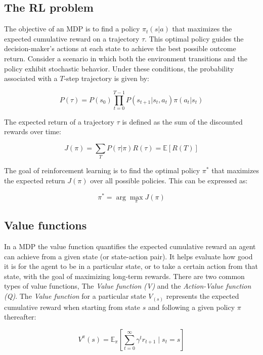 \subsection{The RL problem}
The objective of an MDP is to find a policy $\pi_t(s|a)$ that maximizes the expected cumulative reward on a trajectory $\tau$. This optimal policy guides the decision-maker's actions at each state to achieve the best possible outcome \cite{markovian_desicion_process_book} return. Consider a scenario in which both the environment transitions and the policy exhibit stochastic behavior. Under these conditions, the probability associated with a $T$-step trajectory is given by:

\begin{equation*}
    P(\tau) = P(s_0) \prod_{t=0}^{T-1} P(s_{t+1}|s_t, a_t) \pi(a_t|s_t)
\end{equation*}

The expected return of a trajectory $\tau$ is defined as the sum of the discounted rewards over time:

\begin{equation*}
    J(\pi) = \sum_{T} P(\tau|\pi)R(\tau) = \mathbb{E}\left[R(T)\right]
\end{equation*}

The goal of reinforcement learning is to find the optimal policy $\pi^*$ that maximizes the expected return $J(\pi)$ over all possible policies. This can be expressed as:

\begin{equation*}
    \pi^* = \arg\max_{\pi} J(\pi)
\end{equation*}

\subsection{Value functions}
In a MDP the value function quantifies the expected cumulative reward an agent can achieve from a given state (or state-action pair). It helps evaluate how good it is for the agent to be in a particular state, or to take a certain action from that state, with the goal of maximizing long-term rewards. There are two common types of value functions, The \emph{Value function (V)} and the \emph{Action-Value function (Q)}.
The \emph{Value function} for a particular state $V_(s)$ represents the expected cumulative reward when starting from state $s$ and following a given policy $\pi$ thereafter:

\begin{equation}
    V^\pi(s) = \mathbb{E}_\pi \left[ \sum_{t=0}^{\infty} \gamma^t r_{t+1} \mid s_t = s \right]
    \label{eq: value_suboptimal}
\end{equation}


